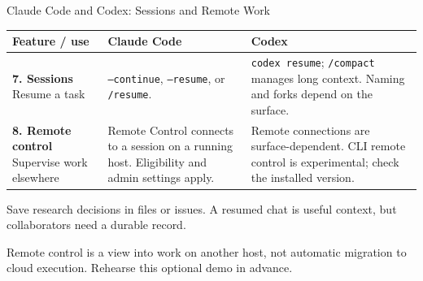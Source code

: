 \begin{frame}{Claude Code and Codex: Sessions and Remote Work}
\small
\renewcommand{\arraystretch}{1.3}
\begin{tabular}{>{\raggedright\arraybackslash}p{2.35cm}>{\raggedright\arraybackslash}p{5.1cm}>{\raggedright\arraybackslash}p{5.1cm}}
\toprule
\textbf{Feature / use} & \textbf{Claude Code} & \textbf{Codex} \\
\midrule
\textbf{7. Sessions} \newline Resume a task & \texttt{--continue}, \texttt{--resume}, or \texttt{/resume}. & \texttt{codex resume}; \texttt{/compact} manages long context. Naming and forks depend on the surface. \\
\textbf{8. Remote control} \newline Supervise work elsewhere & Remote Control connects to a session on a running host. Eligibility and admin settings apply. & Remote connections are surface-dependent. CLI remote control is experimental; check the installed version. \\
\bottomrule
\end{tabular}
\par\vspace{0.35cm}
\normalsize
Save research decisions in files or issues. A resumed chat is useful context, but collaborators need a durable record.
\par\vspace{0.2cm}
\small Remote control is a view into work on another host, not automatic migration to cloud execution. Rehearse this optional demo in advance.
\par\vfill
{}
\end{frame}

